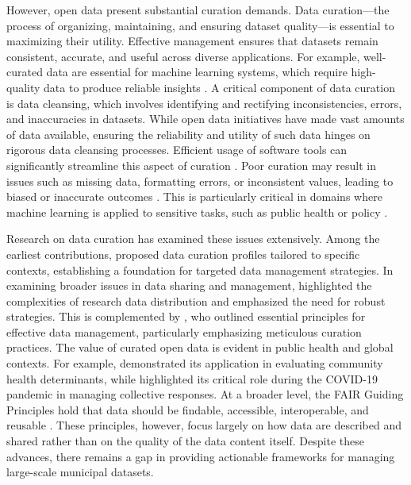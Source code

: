 \documentclass[linenumber]{jdsart}
\begin{document}
However, open data present substantial curation demands.
Data curation—the process of organizing, maintaining, and ensuring
dataset quality—is essential to maximizing their utility.
Effective management ensures that datasets remain consistent,
accurate, and useful across diverse applications.
For example, well-curated data are essential for machine learning systems, which 
require high-quality data to produce reliable insights 
\citep{polyzotis2019data, jain2020overview}. A critical component of 
data curation is data cleansing, which involves identifying and rectifying 
inconsistencies, errors, and inaccuracies in datasets. While open data 
initiatives have made vast amounts of data available, ensuring the 
reliability and utility of such data hinges on rigorous data cleansing processes. 
Efficient usage of software tools can significantly streamline this 
aspect of curation \citep[e.g.,][]{cody2017cody, van2018statistical}. Poor 
curation may result in issues such as missing data, formatting errors, 
or inconsistent values, leading to biased or inaccurate outcomes 
\citep{geiger2020garbage}. This is particularly critical in domains 
where machine learning is applied to sensitive tasks, such as public 
health or policy \citep{rahm2000data}. 


Research on data curation has examined these issues extensively.
Among the earliest contributions, \citet{witt2009constructing}
proposed data curation profiles tailored to specific contexts,
establishing a foundation for targeted data management strategies.
In examining broader issues in data sharing and management,
\citet{borgman2012conundrum} highlighted the complexities of
research data distribution and emphasized the need for robust strategies.
This is complemented by \citet{hart2016ten}, who outlined 
essential principles for effective data management, particularly 
emphasizing meticulous curation practices. The value of curated 
open data is evident in public health and global contexts. For 
example, \citet{cantor2018facets} demonstrated its application in evaluating
community health determinants, while \citet{shankar2021data} highlighted
its critical role during the COVID-19 pandemic in managing collective responses.
At a broader level, the FAIR Guiding Principles hold that data should
be findable, accessible, interoperable, and reusable
\citep{wilkinson2016fair}. These principles, however, focus largely on
how data are described and shared rather than on the quality of the
data content itself.
Despite these advances, there remains a gap in providing
actionable frameworks for managing large-scale municipal datasets.
\end{document}
